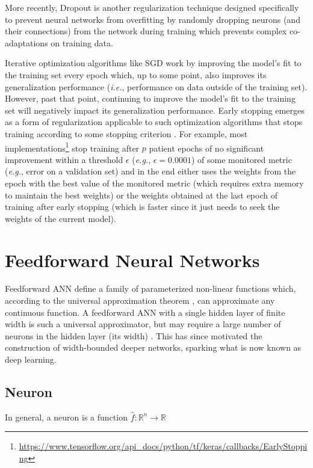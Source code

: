More recently, Dropout \cite{dropout} is another regularization technique designed specifically to prevent neural networks from overfitting by randomly dropping neurons (and their connections) from the network during training which prevents complex co-adaptations on training data.

Iterative optimization algorithms like \ac{SGD} work by improving the model's fit to the training set every epoch which, up to some point, also improves its generalization performance (\textit{i.e.}, performance on data outside of the training set). However, past that point, continuing to improve the model's fit to the training set will negatively impact its generalization performance. Early stopping emerges as a form of regularization applicable to such optimization algorithms that stops training according to some stopping criterion \cite{earlystopping} \cite{deeplearning}. For example, most implementations\footnote{\url{https://www.tensorflow.org/api_docs/python/tf/keras/callbacks/EarlyStopping}} stop training after $p$ patient epochs of no significant improvement within a threshold $\epsilon$ (\textit{e.g.}, $\epsilon = 0.0001$) of some monitored metric (\textit{e.g.}, error on a validation set) and in the end either uses the weights from the epoch with the best value of the monitored metric (which requires extra memory to maintain the best weights) or the weights obtained at the last epoch of training after early stopping (which is faster since it just needs to seek the weights of the current model).

\section{Feedforward Neural Networks}

Feedforward \ac{ANN} define a family of parameterized non-linear functions which, according to the universal approximation theorem \cite{uat}, can approximate any continuous function. A feedforward \ac{ANN} with a single hidden layer of finite width is such a universal approximator, but may require a large number of neurons in the hidden layer (its width) \cite{uat}. This has since motivated the construction of width-bounded deeper networks, sparking what is now known as deep learning.

\subsection{Neuron}

In general, a neuron is a function $\hat{f} \colon \mathbb{R}^n \to \mathbb{R}$


